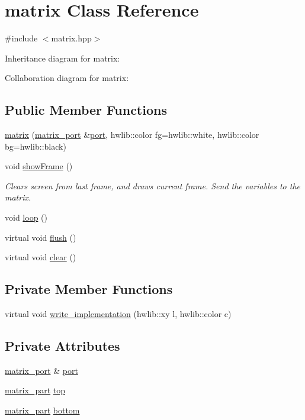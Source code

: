 \hypertarget{classmatrix}{}\section{matrix Class Reference}
\label{classmatrix}


{\ttfamily \#include $<$matrix.\+hpp$>$}



Inheritance diagram for matrix\+:


Collaboration diagram for matrix\+:
\subsection*{Public Member Functions}
\begin{DoxyCompactItemize}
\item 
\hyperlink{classmatrix_a5b188e2d48833305f8a1b6db34e40521}{matrix} (\hyperlink{classmatrix__port}{matrix\+\_\+port} \&\hyperlink{classmatrix_a41ef5702ec1ac3c3e23d6fe12ad58c57}{port}, hwlib\+::color fg=hwlib\+::white, hwlib\+::color bg=hwlib\+::black)
\item 
void \hyperlink{classmatrix_a78bca859b321539d1749b0d3ef8c11c5}{show\+Frame} ()
\begin{DoxyCompactList}\small\item\em Clears screen from last frame, and draws current frame. Send the variables to the matrix. \end{DoxyCompactList}\item 
void \hyperlink{classmatrix_a6d2edd1ca96668aed4dfa402fb558d8c}{loop} ()
\item 
virtual void \hyperlink{classmatrix_a867830c5b26171d0b031aadeb8ad1eee}{flush} ()
\item 
virtual void \hyperlink{classmatrix_a58f399a7e96f56100491d6d8ad235f68}{clear} ()
\end{DoxyCompactItemize}
\subsection*{Private Member Functions}
\begin{DoxyCompactItemize}
\item 
virtual void \hyperlink{classmatrix_a81034d9b2d1b26438be9861e837a962b}{write\+\_\+implementation} (hwlib\+::xy l, hwlib\+::color c)
\end{DoxyCompactItemize}
\subsection*{Private Attributes}
\begin{DoxyCompactItemize}
\item 
\hyperlink{classmatrix__port}{matrix\+\_\+port} \& \hyperlink{classmatrix_a41ef5702ec1ac3c3e23d6fe12ad58c57}{port}
\item 
\hyperlink{classmatrix__part}{matrix\+\_\+part} \hyperlink{classmatrix_ada4fc9c5734e5c7b27fe525bae27be7c}{top}
\item 
\hyperlink{classmatrix__part}{matrix\+\_\+part} \hyperlink{classmatrix_a8a571e0a29b41e59f71d851fa3dfc227}{bottom}
\end{DoxyCompactItemize}
